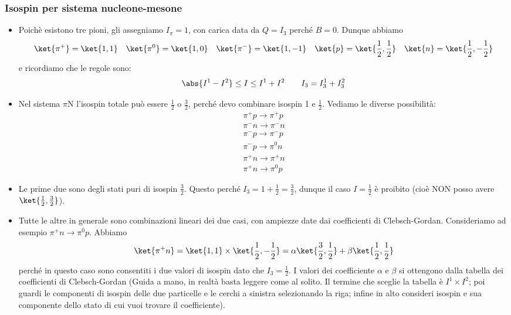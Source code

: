 \subsubsection{Isospin per sistema nucleone-mesone}
\begin{itemize}
    \item Poichè esistono tre pioni, gli assegniamo $I_\pi=1$, con carica data da $Q=I_3$ perché $B=0$. Dunque abbiamo
    \begin{equation*}
        \ket{\pi^+}=\ket{1,1}\quad\ket{\pi^0}=\ket{1,0}\quad\ket{\pi^-}=\ket{1,-1}\quad\ket{p}=\ket{\frac12,\frac12}\quad\ket{n}=\ket{\frac12,-\frac12}
    \end{equation*}
    e ricordiamo che le regole sono:
    \begin{equation*}
        \abs{I^1-I^2}\leq I\leq I^1+I^2\qquad I_3=I_3^1+I_3^2
    \end{equation*}
    \item Nel sistema $\pi$N l'isospin totale può essere $\frac12$ o $\frac32$, perché devo combinare isospin 1 e $\frac12$. Vediamo le diverse possibilità:
    \begin{gather*}
        \pi^+p\to\pi^+p\\
        \pi^-n\to\pi^-n\\
        \pi^-p\to\pi^-p\\
        \pi^-p\to\pi^0n\\
        \pi^+n\to\pi^+n\\
        \pi^+n\to\pi^0p
    \end{gather*}
    \item Le prime due sono degli stati puri di isospin $\frac32$. Questo perché $I_3=1+\frac12=\frac32$, dunque il caso $I=\frac12$ è proibito (cioè NON posso avere $\ket{\frac12,\frac32}$).
    \item Tutte le altre in generale sono combinazioni lineari dei due casi, con ampiezze date dai coefficienti di Clebsch-Gordan. Consideriamo ad esempio $\pi^+n\to\pi^0p$. Abbiamo 
    \begin{equation*}
        \ket{\pi^+n}=\ket{1,1}\times\ket{\frac12,-\frac12}=\alpha\ket{\frac32,\frac12}+\beta\ket{\frac12,\frac12}
    \end{equation*}
    perché in questo caso sono consentiti i due valori di isospin dato che $I_3=\frac12$. I valori dei coefficiente $\alpha$ e $\beta$ si ottengono dalla tabella dei coefficienti di Clebsch-Gordan (Guida a mano, in realtà basta leggere come al solito. Il termine che sceglie la tabella è $I^1\times I^2$; poi guardi le componenti di isospin delle due particelle e le cerchi a sinistra selezionando la riga; infine in alto consideri isospin e sua componente dello stato di cui vuoi trovare il coefficiente).

\end{itemize}
